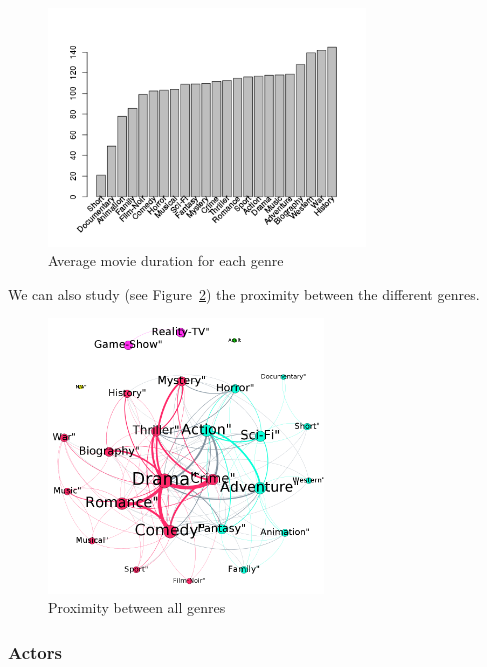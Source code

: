 \begin{figure}[!h]
\begin{center}
\includegraphics[width=0.75\textwidth]{../src/pre-processing/stats/results/dureeByGenre.png}
\end{center}
\caption{Average movie duration for each genre}
\label{fig:dureeByGenre}
\end{figure}

We can also study (see Figure~\ref{fig:coocGenre}) the proximity between the different genres.

\begin{figure}[!h]
\begin{center}
\includegraphics[width=0.65\textwidth]{../src/pre-processing/stats/results/CoocGenre.png}
\end{center}
\caption{Proximity between all genres}
\label{fig:coocGenre}
\end{figure}

\newpage
\subsubsection{Actors}
\label{subs:Actors}

